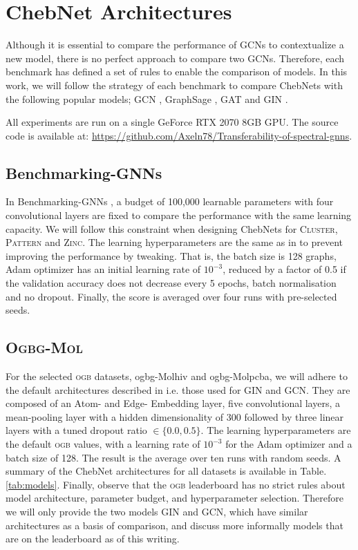 \documentclass[letterpaper]{article} \usepackage{aaai21}  \usepackage{times}  \usepackage{helvet} \usepackage{courier}  \usepackage[hyphens]{url}  \usepackage{graphicx} \usepackage{natbib}  \usepackage{caption} \frenchspacing  \setlength{\pdfpagewidth}{8.5in}  \setlength{\pdfpageheight}{11in}
\begin{document}
\section{ChebNet Architectures}

Although it is essential to compare the performance of GCNs to contextualize a new model, there is no perfect approach to compare two GCNs.
Therefore, each benchmark has defined a set of rules to enable the comparison of models. In this work, we will follow the strategy of each benchmark to compare ChebNets with the following popular models; GCN \cite{kipf_semi-supervised_2017}, GraphSage \cite{hamilton_inductive_2017}, GAT \cite{velickovic_graph_2018} and GIN \cite{xu_how_2019}.

All experiments are run on a single GeForce RTX 2070 8GB GPU. The source code is available at:
\url{https://github.com/Axeln78/Transferability-of-spectral-gnns}.


\subsection{Benchmarking-GNNs}
In Benchmarking-GNNs \cite{dwivedi_benchmarking_2020}, a budget of 100,000 learnable parameters with four convolutional layers are fixed to compare the performance with the same learning capacity. We will follow this constraint when designing ChebNets for \textsc{Cluster}, \textsc{Pattern} and \textsc{Zinc}. The learning hyperparameters are the same as in \cite{dwivedi_benchmarking_2020} to prevent improving the performance by tweaking. That is, the batch size is 128 graphs, Adam optimizer has an initial learning rate of $10^{-3}$, reduced by a factor of 0.5 if the validation accuracy does not decrease every 5 epochs, batch normalisation and no dropout. Finally, the score is averaged over four runs with pre-selected seeds.


\subsection{\textsc{Ogbg-Mol}}
For the selected \textsc{ogb} datasets, ogbg-Molhiv and ogbg-Molpcba, we will adhere to the default architectures described in \cite{hu_open_2020} i.e. those used for GIN and GCN.
They are composed of an Atom- and Edge- Embedding layer, five convolutional layers, a mean-pooling layer with a hidden dimensionality of 300 followed by three linear layers with a tuned dropout ratio $\in \{0.0 , 0.5\}$.
The learning hyperparameters are the default \textsc{ogb} values, with a learning rate of $10^{-3}$ for the Adam optimizer and a batch size of 128. The result is the average over ten runs with random seeds.
A summary of the ChebNet architectures for all datasets is available in Table. \ref{tab:models}.
Finally, observe that the \textsc{ogb} leaderboard has no strict rules about model architecture, parameter budget, and hyperparameter selection.
Therefore we will only provide the two models GIN and GCN, which have similar architectures as a basis of comparison, and discuss more informally models that are on the leaderboard as of this writing.
\end{document}
